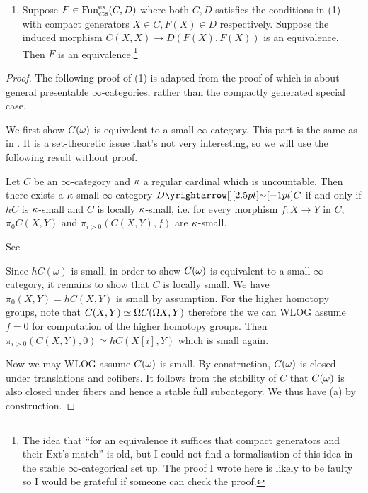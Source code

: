 \documentclass[./main.tex]{subfiles}
\begin{document}
\begin{prop}
\begin{enumerate}
    \item Suppose $F \in \mathrm{Fun}^{\mathrm{ex}}_{\mathrm{cts}}(C , D)$ where
    both $C, D$ satisfies the conditions in (1) with
    compact generators $X \in C , F(X) \in D$ respectively.
    Suppose the induced morphism $C(X,X) \to D(F(X) , F(X))$ is 
    an equivalence.
    Then $F$ is an equivalence.\footnote{
      The idea that ``for an equivalence it suffices that
      compact generators and their $\mathrm{Ext}$'s match''
      is old,
      but I could not find a formalisation of this idea
      in the stable $\infty$-categorical set up.
      The proof I wrote here is likely to be faulty so
      I would be grateful if someone can check the proof.
    }
  \end{enumerate}
\end{prop}
\begin{proof}
  The following proof of (1) is adapted from the proof of 
  \cite[Prop 1.4.4.2]{Lurie-HA}
  which is about general presentable $\infty$-categories,
  rather than the compactly generated special case.

  We first show $C(\omega)$ is equivalent to a small $\infty$-category.
  This part is the same as in \cite[Prop 1.4.4.2]{Lurie-HA}.
  It is a set-theoretic issue that's not very interesting,
  so we will use the following result without proof.
  \begin{lem}

    Let $C$ be an $\infty$-category and $\kappa$ a regular cardinal 
    which is uncountable.
    Then there exists a $\kappa$-small $\infty$-category $D \map{\sim}{} C$
    if and only if $hC$ is $\kappa$-small and $C$ is locally $\kappa$-small,
    i.e. for every morphism $f : X \to Y$ in $C$,
    $\pi_0 C(X,Y)$ and $\pi_{i > 0}(C(X,Y) , f)$ are $\kappa$-small.
    \begin{proof1}
      See \cite[Prop 5.4.1.2]{Lurie-HTT}
    \end{proof1}
  \end{lem}
  Since $h C(\omega)$ is small, in order to show $C(\omega)$ is equivalent to
  a small $\infty$-category,
  it remains to show that $C$ is locally small. 
  We have $\pi_0 (X , Y) = hC(X , Y)$ is small by assumption.
  For the higher homotopy groups, note that 
  $C(X,Y) \simeq \Omega C(\Omega X , Y)$ therefore
  the we can WLOG assume $f = 0$ for computation of the higher homotopy groups.
  Then $\pi_{i > 0}(C(X,Y), 0) \simeq h C(X[i] , Y)$ which is small again.

  Now we may WLOG assume $C(\omega)$ is small.
  By construction, $C(\omega)$ is closed under translations and cofibers.
  It follows from the stability of $C$ that $C(\omega)$ is also closed under
  fibers and hence a stable full subcategory.
  We thus have (a) by construction.


\end{proof}
\end{document}
